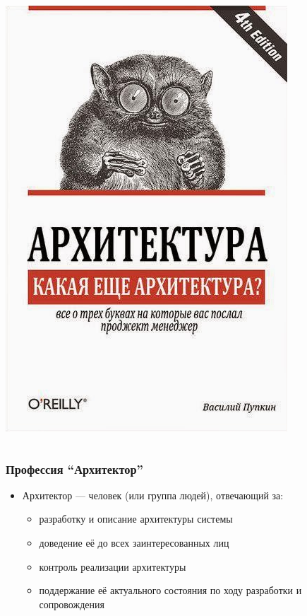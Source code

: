 \documentclass{../../slides-style}
\begin{document}
\begin{frame}
\begin{columns}
\begin{column}{0.3\textwidth}
\begin{center}
                    \includegraphics[width=\textwidth]{whatArchitecture.png}
                \end{center}
            \end{column}
        \end{columns}
    \end{frame}

    \begin{frame}
        \frametitle{Профессия \enquote{Архитектор}}
        \begin{itemize}
            \item Архитектор --- человек (или группа людей), отвечающий за:
            \begin{itemize}
                \item разработку и описание архитектуры системы
                \item доведение её до всех заинтересованных лиц
                \item контроль реализации архитектуры
                \item поддержание её актуального состояния по ходу разработки и сопровождения
            \end{itemize}
        \end{itemize}
    \end{frame}
\end{document}
